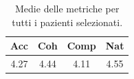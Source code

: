 
\begin{table}[!h]
\centering
\begin{tabular}{||c c c c||}
\hline
Acc & Coh & Comp & Nat \\ [0.5ex]
\hline\hline
4.27 & 4.44 & 4.11 & 4.55 \\
\hline
\end{tabular}
\caption{Medie delle metriche per tutti i pazienti selezionati.}
\label{tab:metriche_finali_pazienti}
\end{table}
